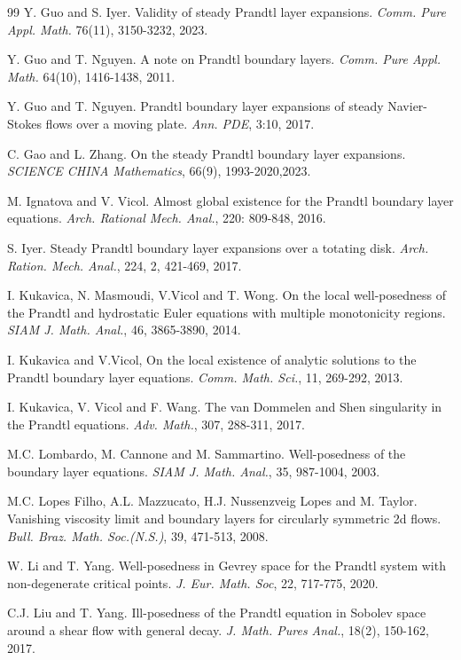 \documentclass{amsart}
\numberwithin{equation}{section}
\begin{document}
\begin{thebibliography}{99}
Y. Guo and S. Iyer. Validity of steady Prandtl layer expansions. {\it Comm. Pure Appl. Math.} 76(11), 3150-3232, 2023.

Y. Guo and T. Nguyen. A note on Prandtl boundary layers. {\it Comm. Pure Appl. Math.} 64(10), 1416-1438, 2011.

Y. Guo and T. Nguyen. Prandtl boundary layer expansions of steady Navier-Stokes flows over a moving plate. {\it Ann. PDE}, 3:10, 2017.

C. Gao and L. Zhang. On the steady Prandtl boundary layer expansions. {\it SCIENCE CHINA Mathematics}, 66(9), 1993-2020,2023.


M. Ignatova and V. Vicol. Almost global existence for the Prandtl boundary layer equations. {\it Arch. Rational Mech. Anal.}, 220: 809-848, 2016.

S. Iyer. Steady Prandtl boundary layer expansions over a totating disk. {\it Arch. Ration. Mech. Anal.}, 224, 2, 421-469, 2017.

I. Kukavica, N. Masmoudi, V.Vicol and T. Wong. On the local well-posedness of the Prandtl and hydrostatic Euler equations with multiple monotonicity regions.
{\it SIAM J. Math. Anal.}, 46, 3865-3890, 2014.

I. Kukavica and V.Vicol, On the local existence of analytic solutions to the Prandtl boundary layer equations.
{\it Comm. Math. Sci.}, 11, 269-292, 2013.

I. Kukavica, V. Vicol and F. Wang. The van Dommelen and Shen singularity in the Prandtl equations. {\it Adv. Math.}, 307, 288-311, 2017.


M.C. Lombardo, M. Cannone and M. Sammartino. Well-posedness of the boundary layer equations. {\it SIAM J. Math. Anal.}, 35, 987-1004, 2003.

M.C. Lopes Filho, A.L. Mazzucato, H.J. Nussenzveig Lopes and M. Taylor. Vanishing viscosity limit and boundary layers for circularly symmetric 2d flows. {\it Bull.  Braz.  Math.  Soc.(N.S.)}, 39, 471-513, 2008.

W. Li and T. Yang. Well-posedness in Gevrey  space for the Prandtl system with non-degenerate critical points. {\it J. Eur. Math. Soc}, 22, 717-775, 2020.

C.J. Liu and T. Yang. Ill-posedness of the Prandtl equation in Sobolev space around a shear flow with general decay. {\it J.  Math. Pures Anal.}, 18(2), 150-162, 2017.


\end{thebibliography}
\end{document}
